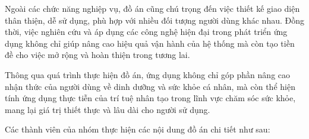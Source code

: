 \documentclass[../main.tex]{subfiles}
\begin{document}
Ngoài các chức năng nghiệp vụ, đồ án cũng chú trọng đến việc thiết kế giao diện thân thiện, dễ sử dụng, phù hợp với nhiều đối tượng người dùng khác nhau. Đồng thời, việc nghiên cứu và áp dụng các công nghệ hiện đại trong phát triển ứng dụng không chỉ giúp nâng cao hiệu quả vận hành của hệ thống mà còn tạo tiền đề cho việc mở rộng và hoàn thiện trong tương lai.

Thông qua quá trình thực hiện đồ án, ứng dụng không chỉ góp phần nâng cao nhận thức của người dùng về dinh dưỡng và sức khỏe cá nhân, mà còn thể hiện tính ứng dụng thực tiễn của trí tuệ nhân tạo trong lĩnh vực chăm sóc sức khỏe, mang lại giá trị thiết thực và lâu dài cho người sử dụng.


\vspace{0.3cm}
\noindent Các thành viên của nhóm thực hiện các nội dung đồ án chi tiết như sau:
\end{document}
